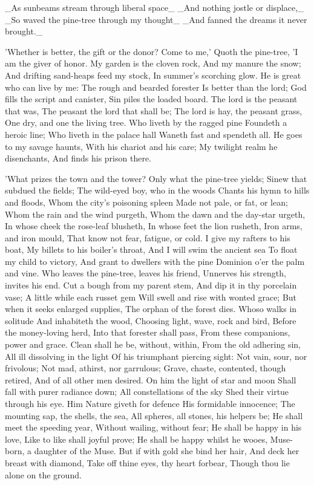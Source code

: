 _As sunbeams stream through liberal space_
_And nothing jostle or displace,_
_So waved the pine-tree through my thought_
_And fanned the dreams it never brought._

'Whether is better, the gift or the donor?
Come to me,'
Quoth the pine-tree,
'I am the giver of honor.
My garden is the cloven rock,
And my manure the snow;
And drifting sand-heaps feed my stock,
In summer's scorching glow.
He is great who can live by me:
The rough and bearded forester
Is better than the lord;
God fills the script and canister,
Sin piles the loaded board.
The lord is the peasant that was,
The peasant the lord that shall be;
The lord is hay, the peasant grass,
One dry, and one the living tree.
Who liveth by the ragged pine
Foundeth a heroic line;
Who liveth in the palace hall
Waneth fast and spendeth all.
He goes to my savage haunts,
With his chariot and his care;
My twilight realm he disenchants,
And finds his prison there.

'What prizes the town and the tower?
Only what the pine-tree yields;
Sinew that subdued the fields;
The wild-eyed boy, who in the woods
Chants his hymn to hills and floods,
Whom the city's poisoning spleen
Made not pale, or fat, or lean;
Whom the rain and the wind purgeth,
Whom the dawn and the day-star urgeth,
In whose cheek the rose-leaf blusheth,
In whose feet the lion rusheth,
Iron arms, and iron mould,
That know not fear, fatigue, or cold.
I give my rafters to his boat,
My billets to his boiler's throat,
And I will swim the ancient sea
To float my child to victory,
And grant to dwellers with the pine
Dominion o'er the palm and vine.
Who leaves the pine-tree, leaves his friend,
Unnerves his strength, invites his end.
Cut a bough from my parent stem,
And dip it in thy porcelain vase;
A little while each russet gem
Will swell and rise with wonted grace;
But when it seeks enlarged supplies,
The orphan of the forest dies.
Whoso walks in solitude
And inhabiteth the wood,
Choosing light, wave, rock and bird,
Before the money-loving herd,
Into that forester shall pass,
From these companions, power and grace.
Clean shall he be, without, within,
From the old adhering sin,
All ill dissolving in the light
Of his triumphant piercing sight:
Not vain, sour, nor frivolous;
Not mad, athirst, nor garrulous;
Grave, chaste, contented, though retired,
And of all other men desired.
On him the light of star and moon
Shall fall with purer radiance down;
All constellations of the sky
Shed their virtue through his eye.
Him Nature giveth for defence
His formidable innocence;
The mounting sap, the shells, the sea,
All spheres, all stones, his helpers be;
He shall meet the speeding year,
Without wailing, without fear;
He shall be happy in his love,
Like to like shall joyful prove;
He shall be happy whilst he wooes,
Muse-born, a daughter of the Muse.
But if with gold she bind her hair,
And deck her breast with diamond,
Take off thine eyes, thy heart forbear,
Though thou lie alone on the ground.

